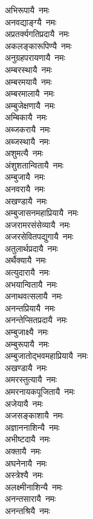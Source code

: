 \begin{flushleft}
\begin{multicols}{2}
अभिरूपायै~नमः\\
अनवद्याङ्ग्यै~नमः\\
अप्रतर्क्यगतिप्रदायै~नमः\\
अकलङ्कारूपिण्यै~नमः\hfill{}\\
अनुग्रहपरायणायै~नमः\\
अम्बरस्थायै~नमः\\
अम्बरमयायै~नमः\\
अम्बरमालायै~नमः\\
अम्बुजेक्षणायै~नमः\\
अम्बिकायै~नमः\\
अब्जकरायै~नमः\\
अब्जस्थायै~नमः\\
अशुमत्यै~नमः\\
अंशुशतान्वितायै~नमः\hfill{}\\
अम्बुजायै~नमः\\
अनवरायै~नमः\\
अखण्डायै~नमः\\
अम्बुजासनमहाप्रियायै~नमः\\
अजरामरसंसेव्यायै~नमः\\
अजरसेवितपद्युगायै~नमः\\
अतुलार्थप्रदायै~नमः\\
अर्थैक्यायै~नमः\\
अत्युदारायै~नमः\\
अभयान्वितायै~नमः\hfill{}\\
अनाथवत्सलायै~नमः\\
अनन्तप्रियायै~नमः\\
अनन्तेप्सितप्रदायै~नमः\\
अम्बुजाक्ष्यै~नमः\\
अम्बुरूपायै~नमः\\
अम्बुजातोद्भवमहाप्रियायै~नमः\\
अखण्डायै~नमः\\
अमरस्तुत्यायै~नमः\\
अमरनायकपूजितायै~नमः\\
अजेयायै~नमः\hfill{}\\
अजसङ्काशायै~नमः\\
अज्ञाननाशिन्यै~नमः\\
अभीष्टदायै~नमः\\
अक्तायै~नमः\\
अघनेनायै~नमः\\
अस्त्रेश्यै~नमः\\
अलक्ष्मीनाशिन्यै~नमः\\
अनन्तसारायै~नमः\\
अनन्तश्रियै~नमः\\

\end{multicols}
\end{flushleft}
